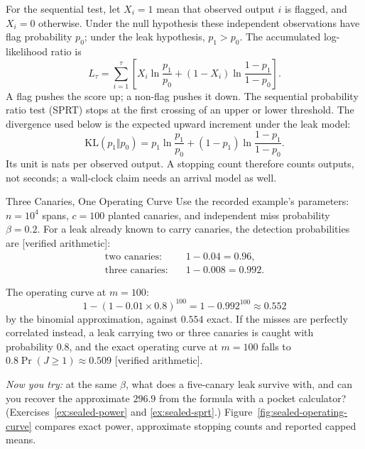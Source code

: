 \documentclass[11pt,a4paper]{article}
\theoremstyle{definition}
\begin{document}
For the sequential test, let $X_i=1$ mean that observed output $i$ is flagged,
and $X_i=0$ otherwise. Under the null hypothesis these independent observations
have flag probability $p_0$; under the leak hypothesis, $p_1>p_0$. The
accumulated log-likelihood ratio is
\[
L_\tau=\sum_{i=1}^{\tau}\left[X_i\ln\frac{p_1}{p_0}
 +(1-X_i)\ln\frac{1-p_1}{1-p_0}\right].
\]
A flag pushes the score up; a non-flag pushes it down. The sequential
probability ratio test (SPRT) stops at the first crossing of an upper or lower
threshold. The divergence used below is the expected upward increment under
the leak model:
\[
\mathrm{KL}(p_1\Vert p_0)=p_1\ln\frac{p_1}{p_0}
 +(1-p_1)\ln\frac{1-p_1}{1-p_0}.
\]
Its unit is nats per observed output. A stopping count therefore counts
outputs, not seconds; a wall-clock claim needs an arrival model as well.

\begin{pdexample}{Three Canaries, One Operating Curve}
\setlength{\parskip}{4pt plus 1pt}
Use the recorded example's parameters: $n=10^4$ spans, $c=100$ planted
canaries, and independent miss probability $\beta=0.2$. For a leak already
known to carry canaries, the detection probabilities are [verified arithmetic]:
\[
\begin{aligned}
\text{two canaries:}\quad &1-0.04=0.96,\\
\text{three canaries:}\quad &1-0.008=0.992.
\end{aligned}
\]

The operating curve at $m=100$:
\[
1-(1-0.01\times0.8)^{100}=1-0.992^{100}\approx0.552
\]
by the binomial approximation, against $0.554$ exact.
If the misses are perfectly correlated instead, a leak carrying two or three
canaries is caught with probability $0.8$, and the exact operating curve at
$m=100$ falls to $0.8\Pr(J\ge1)\approx0.509$ [verified arithmetic].

\emph{Now you try:} at the
same $\beta$, what does a five-canary leak survive with, and can you recover
the approximate $296.9$ from the formula with a pocket calculator?
(Exercises~\ref{ex:sealed-power} and \ref{ex:sealed-sprt}.)
Figure~\ref{fig:sealed-operating-curve} compares exact power, approximate
stopping counts and reported capped means.
\end{pdexample}
\end{document}
